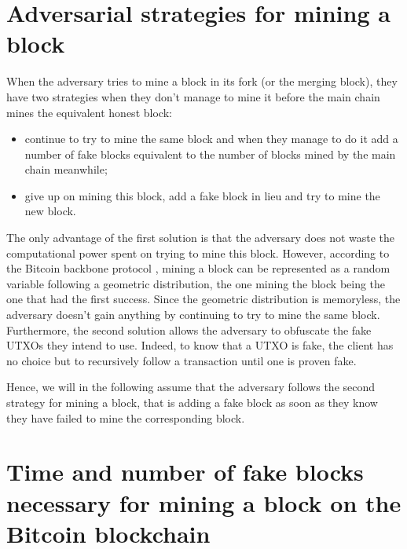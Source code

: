 \section{Adversarial strategies for mining a block}
\label{section:miningstrategies}
    When the adversary tries to mine a block in its fork (or the merging block), they have two strategies when they don't manage to mine it before the main chain mines the equivalent honest block:
    \begin{itemize}
        \item continue to try to mine the same block and when they manage to do it add a number of fake blocks equivalent to the number of blocks mined by the main chain meanwhile;
        \item give up on mining this block, add a fake block in lieu and try to mine the new block.
    \end{itemize}
    The only advantage of the first solution is that the adversary does not waste the computational power spent on trying to mine this block. However, according to the Bitcoin backbone protocol \cite{Backbone}, mining a block can be represented as a random variable following a geometric distribution, the one mining the block being the one that had the first success. Since the geometric distribution is memoryless, the adversary doesn't gain anything by continuing to try to mine the same block. Furthermore, the second solution allows the adversary to obfuscate the fake UTXOs they intend to use. Indeed, to know that a UTXO is fake, the client has no choice but to recursively follow a transaction until one is proven fake.
    
    Hence, we will in the following assume that the adversary follows the second strategy for mining a block, that is adding a fake block as soon as they know they have failed to mine the corresponding block.

\section{Time and number of fake blocks necessary for mining a block on the Bitcoin blockchain}
\label{section:blockmined}


